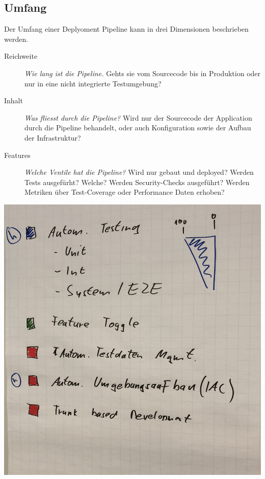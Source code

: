 \documentclass[a4paper]{article}
\begin{document}
\subsection*{Umfang}
Der Umfang einer Deplyoment Pipeline kann in drei Dimensionen beschrieben werden.
\begin{description}
  \item[Reichweite] \textit{Wie lang ist die Pipeline.} Gehts sie vom Sourcecode bis in Produktion oder nur in eine nicht integrierte Testumgebung?
  \item[Inhalt] \textit{Was fliesst durch die Pipeline?} Wird nur der Sourcecode der Application durch die Pipeline behandelt, oder auch Konfiguration sowie der Aufbau der Infrastruktur?
  \item[Features] \textit{Welche Ventile hat die Pipeline?} Wird nur gebaut und deployed? Werden Tests ausgefürht? Welche? Werden Security-Checks ausgeführt? Werden Metriken über Test-Coverage oder Performance Daten erhoben?
\end{description}

\begin{center}
\includegraphics[width=0.5\paperwidth,keepaspectratio]{pictures/ScopeDPmyHelsana.jpg}
\end{center}
\end{document}
